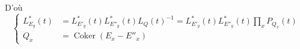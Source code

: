 D'où
\[
 \left\{\begin{aligned}
 L^*_{E_y}(t)&=L^*_{E'_y}(t)L^*_{E''_y}(t)L_Q(t)^{-1}
 =L^*_{E'_y}(t)L^*_{E''_y}(t)\prod_x P_{Q_x}(t)\\
 Q_x&=\operatorname{Coker}\left(E_x\mathbin{-}E''_x\right)
 \end{aligned}\right.
\]

